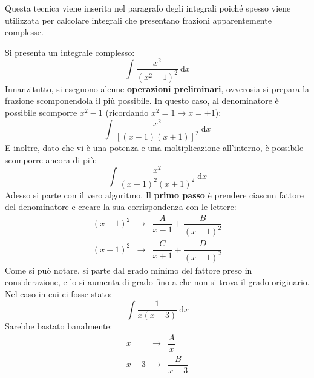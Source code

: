 \documentclass[a4paper]{article}
\begin{document}
	\noindent
	Questa tecnica viene inserita nel paragrafo degli integrali poiché spesso viene utilizzata per calcolare integrali che presentano frazioni apparentemente complesse.\newline

	\noindent
	Si presenta un integrale complesso:
	\begin{equation*}
		\displaystyle\int\dfrac{x^{2}}{\left(x^{2} - 1\right)^{2}} \: \mathrm{d}x
	\end{equation*}
	Innanzitutto, si eseguono alcune \textbf{operazioni preliminari}, ovverosia si prepara la frazione scomponendola il più possibile. In questo caso, al denominatore è possibile scomporre $x^{2}-1$ (ricordando $x^{2} = 1 \rightarrow x = \pm 1$):
	\begin{equation*}
		\displaystyle\int\dfrac{x^{2}}{\left[\left(x-1\right)\left(x+1\right)\right]^{2}} \: \mathrm{d}x
	\end{equation*}
	E inoltre, dato che vi è una potenza e una moltiplicazione all'interno, è possibile scomporre ancora di più:
	\begin{equation*}
		\displaystyle\int\dfrac{x^{2}}{\left(x-1\right)^{2}\left(x+1\right)^{2}} \: \mathrm{d}x
	\end{equation*}
	Adesso si parte con il vero algoritmo. Il \textbf{primo passo} è prendere ciascun fattore del denominatore e creare la sua corrispondenza con le lettere:
	\begin{equation*}
		\begin{array}{rcl}
			\left(x-1\right)^{2} &\longrightarrow& \dfrac{A}{x-1} + \dfrac{B}{\left(x-1\right)^{2}} \\ [1em]
			\left(x+1\right)^{2} &\longrightarrow& \dfrac{C}{x+1} + \dfrac{D}{\left(x-1\right)^{2}}
		\end{array}
	\end{equation*}
	Come si può notare, si parte dal grado minimo del fattore preso in considerazione, e lo si aumenta di grado fino a che non si trova il grado originario. Nel caso in cui ci fosse stato:
	\begin{equation*}
		\displaystyle \int\dfrac{1}{x\left(x-3\right)} \: \mathrm{d}x
	\end{equation*}
	Sarebbe bastato banalmente:
	\begin{equation*}
		\begin{array}{rcl}
			x &\longrightarrow& \dfrac{A}{x} \\ [1em]
			x-3 &\longrightarrow& \dfrac{B}{x-3}
		\end{array}
	\end{equation*}
\end{document}
